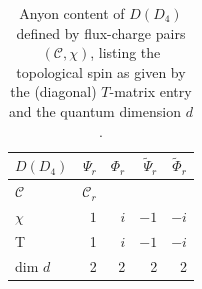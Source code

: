 \documentclass[two column]{article}
\begin{document}
\begin{table}
\vspace{0.5cm}
\begin{subtable}{\textwidth}
\raggedright
\begin{tabular}{l||rrrr}
$D(D_4)$  & $\Psi_{r}$ &  $\Phi_{r}$ & $\tilde{\Psi}_{r}$ & $\tilde{\Phi}_{r}$ \\ \hline
$\mathcal C$    & $\mathcal C_r$    &            &    &             \\ %
$\chi$ & $1$    & $ i$              & $-1$     & $- i$   \\           %
\hline
T  & 1 & $i$ & $-1$ & $-i$ \\
dim $d$ & 2 & 2 & 2 & 2
\end{tabular}
\end{subtable} 
\caption{  Anyon content of $D(D_4)$ defined by flux-charge pairs $(\mathcal C,\chi)$, listing the topological spin as given by the (diagonal) $T$-matrix entry and the quantum dimension $d$. }\label{tab:anyons}
\end{table}
\end{document}
